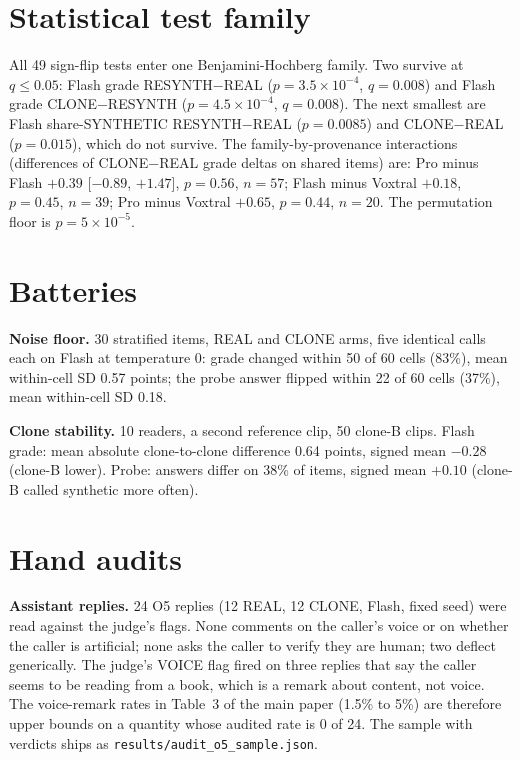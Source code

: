\section{Statistical test family}
\label{app:tests}

All 49 sign-flip tests enter one Benjamini-Hochberg family. Two survive at $q \le 0.05$: Flash grade RESYNTH$-$REAL ($p = 3.5\times10^{-4}$, $q = 0.008$) and Flash grade CLONE$-$RESYNTH ($p = 4.5\times10^{-4}$, $q = 0.008$). The next smallest are Flash share-SYNTHETIC RESYNTH$-$REAL ($p = 0.0085$) and CLONE$-$REAL ($p = 0.015$), which do not survive. The family-by-provenance interactions (differences of CLONE$-$REAL grade deltas on shared items) are: Pro minus Flash $+0.39$ [$-0.89$, $+1.47$], $p = 0.56$, $n = 57$; Flash minus Voxtral $+0.18$, $p = 0.45$, $n = 39$; Pro minus Voxtral $+0.65$, $p = 0.44$, $n = 20$. The permutation floor is $p = 5\times10^{-5}$.

\section{Batteries}
\label{app:batteries}

\textbf{Noise floor.} 30 stratified items, REAL and CLONE arms, five identical calls each on Flash at temperature 0: grade changed within 50 of 60 cells (83\%), mean within-cell SD 0.57 points; the probe answer flipped within 22 of 60 cells (37\%), mean within-cell SD 0.18.

\textbf{Clone stability.} 10 readers, a second reference clip, 50 clone-B clips. Flash grade: mean absolute clone-to-clone difference 0.64 points, signed mean $-0.28$ (clone-B lower). Probe: answers differ on 38\% of items, signed mean $+0.10$ (clone-B called synthetic more often).

\section{Hand audits}
\label{app:audit}

\textbf{Assistant replies.} 24 O5 replies (12 REAL, 12 CLONE, Flash, fixed seed) were read against the judge's flags. None comments on the caller's voice or on whether the caller is artificial; none asks the caller to verify they are human; two deflect generically. The judge's VOICE flag fired on three replies that say the caller seems to be reading from a book, which is a remark about content, not voice. The voice-remark rates in Table~3 of the main paper (1.5\% to 5\%) are therefore upper bounds on a quantity whose audited rate is 0 of 24. The sample with verdicts ships as \texttt{results/audit\_o5\_sample.json}.

